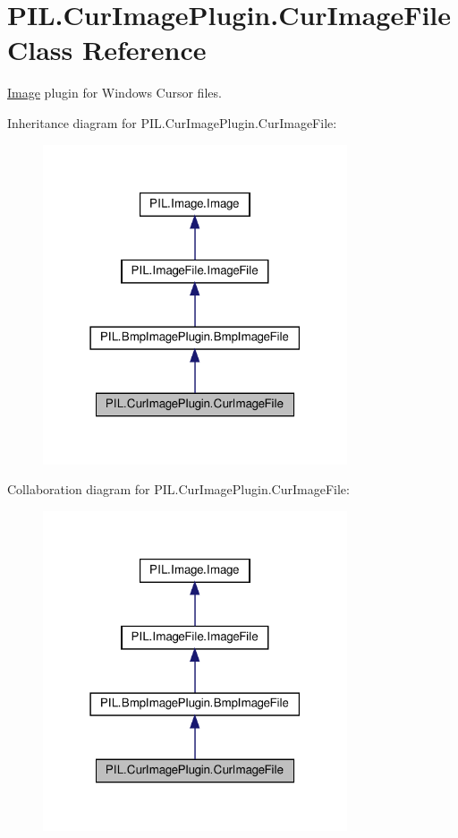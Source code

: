 \hypertarget{classPIL_1_1CurImagePlugin_1_1CurImageFile}{}\section{P\+I\+L.\+Cur\+Image\+Plugin.\+Cur\+Image\+File Class Reference}
\label{classPIL_1_1CurImagePlugin_1_1CurImageFile}


\hyperlink{namespacePIL_1_1Image}{Image} plugin for Windows Cursor files.  




Inheritance diagram for P\+I\+L.\+Cur\+Image\+Plugin.\+Cur\+Image\+File\+:
\nopagebreak
\begin{figure}[H]
\begin{center}
\leavevmode
\includegraphics[width=255pt]{classPIL_1_1CurImagePlugin_1_1CurImageFile__inherit__graph}
\end{center}
\end{figure}


Collaboration diagram for P\+I\+L.\+Cur\+Image\+Plugin.\+Cur\+Image\+File\+:
\nopagebreak
\begin{figure}[H]
\begin{center}
\leavevmode
\includegraphics[width=255pt]{classPIL_1_1CurImagePlugin_1_1CurImageFile__coll__graph}
\end{center}
\end{figure}
